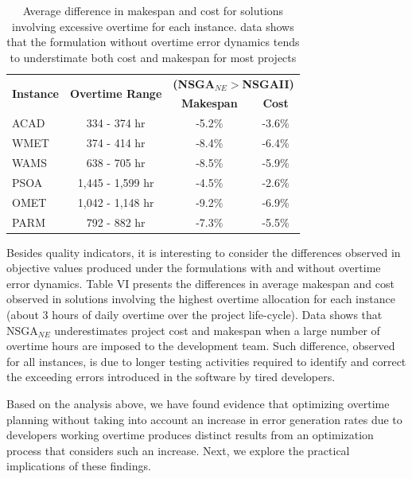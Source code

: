 \documentclass[conference]{IEEEtran}
\begin{document}
\begin{table}[htbp]
	\scriptsize
  \centering
  \caption{Average difference in makespan and cost for solutions involving excessive overtime for each instance. data shows that the formulation without overtime error dynamics tends to understimate both cost and makespan for most projects}
    \begin{tabular}{rccc}
    \toprule
    \multicolumn{1}{c}{\multirow{2}[2]{*}{\textbf{Instance}}} & \multirow{2}[2]{*}{\textbf{Overtime  Range}} & \multicolumn{2}{c}{\textbf{(NSGA$_{NE}>$NSGAII)}} \\

    \multicolumn{1}{c}{} &       & \textbf{Makespan } & \textbf{Cost} \\
        \midrule
    \multicolumn{1}{l}{ACAD} &   334 -   374 hr & -5.2\% & -3.6\% \\
    \multicolumn{1}{l}{WMET} &   374 -   414 hr & -8.4\% & -6.4\% \\
    \multicolumn{1}{l}{WAMS} &   638 -   705 hr & -8.5\% & -5.9\% \\
    \multicolumn{1}{l}{PSOA} & 1,445 - 1,599 hr & -4.5\% & -2.6\% \\
    \multicolumn{1}{l}{OMET} & 1,042 - 1,148 hr & -9.2\% & -6.9\% \\
    \multicolumn{1}{l}{PARM} &   792 -   882 hr & -7.3\% & -5.5\% \\
    \bottomrule
    \end{tabular}%
\end{table}%

Besides quality indicators, it is interesting to consider the differences observed in objective values produced under the formulations with and without overtime error dynamics. Table VI presents the differences in average makespan and cost observed in solutions involving the highest overtime allocation for each instance (about 3 hours of daily overtime over the project life-cycle). Data shows that NSGA$_{NE}$ underestimates project cost and makespan when a large number of overtime hours are imposed to the development team. Such difference, observed for all instances, is due to longer testing activities required to identify and correct the exceeding errors introduced in the software by tired developers.

Based on the analysis above, we have found evidence that optimizing overtime planning without taking into account an increase in error generation rates due to developers working overtime produces distinct results from an optimization process that considers such an increase. Next, we explore the practical implications of these findings.
\end{document}

